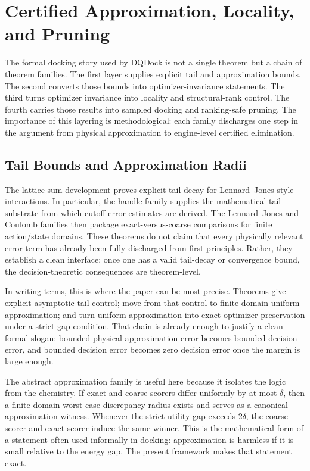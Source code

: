 \section{Certified Approximation, Locality, and Pruning}\label{sec:physics}

The formal docking story used by DQDock is not a single theorem but a chain of theorem families. The first layer supplies explicit tail and approximation bounds. The second converts those bounds into optimizer-invariance statements. The third turns optimizer invariance into locality and structural-rank control. The fourth carries those results into sampled docking and ranking-safe pruning. The importance of this layering is methodological: each family discharges one step in the argument from physical approximation to engine-level certified elimination.

\subsection{Tail Bounds and Approximation Radii}

The lattice-sum development proves explicit tail decay for Lennard--Jones-style interactions. In particular, the handle family  supplies the mathematical tail substrate from which cutoff error estimates are derived. The Lennard--Jones and Coulomb families  then package exact-versus-coarse comparisons for finite action/state domains. These theorems do not claim that every physically relevant error term has already been fully discharged from first principles. Rather, they establish a clean interface: once one has a valid tail-decay or convergence bound, the decision-theoretic consequences are theorem-level.

In writing terms, this is where the paper can be most precise. Theorems  give explicit asymptotic tail control;  move from that control to finite-domain uniform approximation; and  turn uniform approximation into exact optimizer preservation under a strict-gap condition. That chain is already enough to justify a clean formal slogan: bounded physical approximation error becomes bounded decision error, and bounded decision error becomes zero decision error once the margin is large enough.

The abstract approximation family  is useful here because it isolates the logic from the chemistry. If exact and coarse scorers differ uniformly by at most $\delta$, then a finite-domain worst-case discrepancy radius exists and serves as a canonical approximation witness. Whenever the strict utility gap exceeds $2\delta$, the coarse scorer and exact scorer induce the same winner. This is the mathematical form of a statement often used informally in docking: approximation is harmless if it is small relative to the energy gap. The present framework makes that statement exact.

